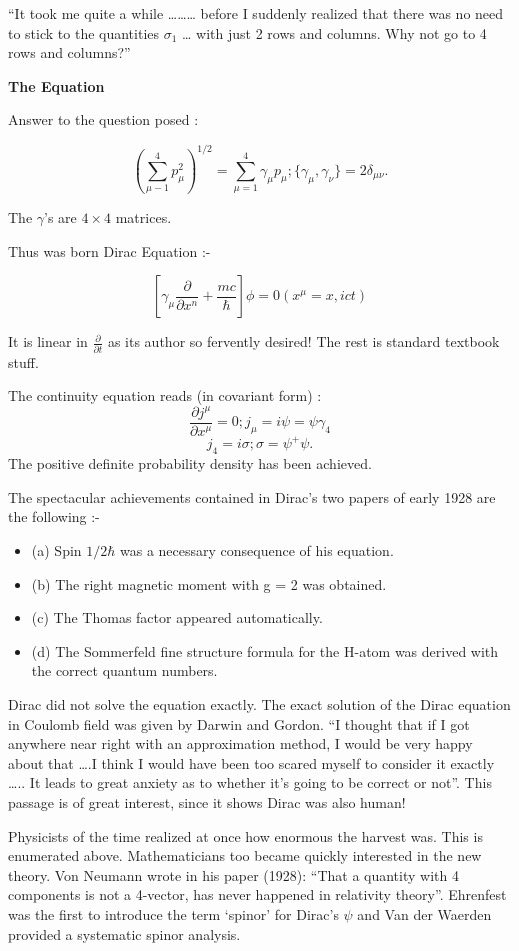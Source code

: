 “It took me quite a while ……… before I suddenly realized that there was no need to stick to the quantities $\sigma_{1}$ … with just 2 rows and columns. Why not go to 4 rows and columns?”

\textbf{The Equation}

Answer to the question posed :

$$
(\sum\limits_{\mu -1}^{4} p_{\mu}^{2})^{1/2} = \sum\limits_{\mu=1}^{4}\gamma_{\mu} p_{\mu} ; \{\gamma_{\mu}, \gamma_{\nu} \} = 2 \delta_{\mu \nu}.
$$

The $\gamma$’s are $4 \times 4$ matrices.

Thus was born Dirac Equation :-

$$
[\gamma_{\mu} \frac{\partial}{\partial x^{n}} + \frac{mc}{\hbar}]\phi = 0 (x^{\mu}= x, ict)
$$

It is linear in $\frac{\partial}{\partial t}$ as its author so fervently desired! The rest is standard textbook stuff.

The continuity equation reads (in covariant form) :
$$
\frac{\partial j^{\mu}}{\partial x^{\mu}} =0 ; j_{\mu} = i \psi = \psi \gamma_{4}
$$
$$
j_{4} = i \sigma ; \sigma = \psi^{+} \psi.
$$					   
The positive definite probability density has been achieved.

	The spectacular achievements contained in Dirac’s two papers of early 1928 are the following :-
\begin{itemize}
    \item(a) Spin $1/2 \hbar$ was a necessary consequence of his equation.
    \item(b) The right magnetic moment with g = 2 was obtained.
    \item(c) The Thomas factor appeared automatically.
    \item(d) The Sommerfeld fine structure formula for the H-atom was derived with the correct quantum numbers.
\end{itemize}    
       
Dirac did not solve the equation exactly. The exact solution of the Dirac equation in Coulomb field was given by Darwin and Gordon. “I thought that if I got anywhere near right with an approximation method, I would be very happy about that ….I think I would have been too scared myself to consider it exactly ….. It leads to great anxiety as to whether it’s going to be correct or not”. This passage is of great interest, since it shows Dirac was also human!

Physicists of the time realized at once how enormous the harvest was. This is enumerated above. Mathematicians too became quickly interested in the new theory. Von Neumann wrote in his paper (1928): “That a quantity with 4 components is not a 4-vector, has never happened in relativity theory”. Ehrenfest was the first to introduce the term ‘spinor’ for Dirac’s $\psi$ and Van der Waerden provided a systematic spinor analysis.

